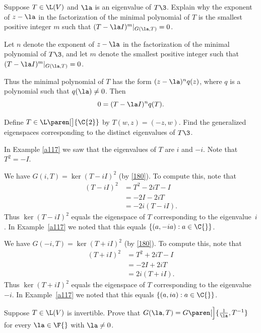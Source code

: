 
\exercise
Suppose $T \in \L(V)$ and $\la$ is an eigenvalue of $T\3$. Explain why the exponent of $z-\la$ in the factorization of the minimal polynomial of $T$ is the smallest positive integer $m$ such that $(T - \la I)^m|_{G(\la, T)} = 0$.

\begin{Solution}
Let $n$ denote the exponent of $z-\la$ in the factorization of the minimal polynomial of $T\3$, and let $m$ denote the smallest positive integer such that $(T - \la I)^m|_{G(\la, T)} = 0$.

Thus the minimal polynomial of $T$ has the form $(z-\la)^n q(z)$, where $q$ is a polynomial such that $q(\la) \ne 0$. Then
\[
0 = (T - \la I)^n q(T).
\]
\end{Solution}

\exercise
Define $T \in \L\paren[\big]{\C{2}}$ by
$
T(w,z) = (-z, w)$.
Find the generalized eigenspaces corresponding to the distinct eigenvalues of $T\3$.

\begin{Solution}
In Example \ref{a117} we saw that the eigenvalues of $T$ are $i$
and $-i$.  Note that $T^2 = -I$.

We have $G(i, T) = \ker (T - iI)^2$ (by \ref{180}).  To compute this, note that
\begin{align*}
(T - iI)^2 &= T^2 - 2iT - I \\
&= -2I - 2iT \\
&= -2i(T - iI).
\end{align*}
Thus $\ker (T - iI)^2$ equals the eigenspace of $T$ corresponding to the
eigenvalue~$i$.  In Example~\ref{a117} we noted that this equals
\mbox{$\{(a, -ia): a \in \C{}\}$}.

We have $G(-i, T) = \ker (T + iI)^2$ (by \ref{180}).  To compute this, note that
\begin{align*}
(T + iI)^2 &= T^2 + 2iT - I \\
&= -2I + 2iT \\
&= 2i(T + iI).
\end{align*}
Thus $\ker (T + iI)^2$ equals the eigenspace of $T$ corresponding to the
eigenvalue~$-i$.  In Example~\ref{a117} we noted that this equals
\mbox{$\{(a, ia): a \in \C{}\}$}.
\end{Solution}

\exercise
Suppose $T \in \L(V)$ is invertible. Prove that $G(\la, T) = G\paren[\Big]{\frac{1}{\la}, T^{-1}}$ for every $\la \in \F{}$ with $\la \ne 0$.

